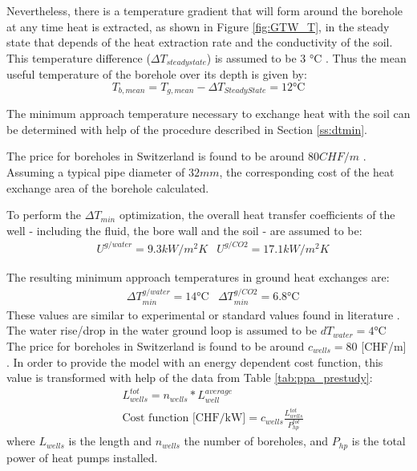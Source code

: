 \documentclass{article}
\begin{document}
Nevertheless, there is a temperature gradient that will form around the borehole at any time heat is extracted, as shown in Figure \ref{fig:GTW_T}, in the steady state that depends of the heat extraction rate and the conductivity of the soil. This temperature difference ($\Delta T_{steady state}$) is assumed to be 3 \si{\celsius} \cite{guoTechnoeconomicComparisonDirect2012,hanSensitivityAnalysisVertical2016}.
Thus the mean useful temperature of the borehole over its depth is given by:
\begin{equation}
	T_{b, mean} = T_{g, mean} -\Delta T_{Steady State} = 12 \si{\celsius}
\end{equation}

The minimum approach temperature necessary to exchange heat with the soil can be determined with help of the procedure described in Section \ref{ss:dtmin}. 

The price for boreholes in Switzerland is found to be around $80 CHF/m$ \cite{bawos.chMitErdsondenbohrungenKosten2018}. 
Assuming a typical pipe diameter of $32 mm$\cite{siaSIA384Sondes2010, kruseStatusDevelopmentResearcha}, the corresponding cost of the heat exchange area of the borehole calculated.

To perform the $\Delta T_{min}$ optimization, the overall heat transfer coefficients of the well - including the fluid, the bore wall and the soil - are assumed to be\cite{kruseStatusDevelopmentResearcha}:
\begin{align}
	& U^{g/water} = 9.3 kW/m^2K
	& U^{g/CO2} = 17.1 kW/m^2K
\end{align}

The resulting minimum approach temperatures in ground heat exchanges are:
\begin{align}
	&\Delta T_{min}^{g/water} = 14 \si{\celsius}
	&\Delta T_{min}^{g/CO2} = 6.8 \si{\celsius}
\end{align}
These values are similar to experimental or standard values found in literature \cite{siaSIA384Sondes2010, lamarcheReviewMethodsEvaluate2010}.\\

The water rise/drop in the water ground loop is assumed to be $dT_{water} = 4 \si{\celsius}$ \cite{lundDESIGNCLOSEDLOOPGEOTHERMAL}\\


The price for boreholes in Switzerland is found to be around $c_{wells} = 80$ [CHF/m] \cite{bawos.chMitErdsondenbohrungenKosten2018}. 
In order to provide the model with an energy dependent cost function, this value is transformed with help of the data from Table \ref{tab:ppa_prestudy}:
\begin{align}
&  L_{wells}^{tot} = n_{wells} * L_{well}^{average} \\
& 	\text{Cost function [CHF/kW]} = c_{wells} \frac{L_{wells}^{tot}}{P_{hp}^{tot}}
\end{align}
where $L_{wells}$ is the length and $n_{wells}$ the number of boreholes, and $P_{hp}$ is the total power of heat pumps installed.\\
\end{document}
